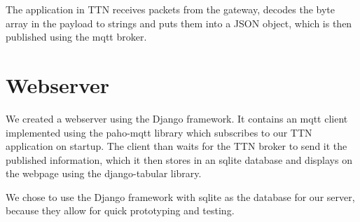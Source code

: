 	The application in TTN receives packets from the gateway, decodes the byte array in the payload to strings and puts them into a JSON object, which is then published using the mqtt broker.

\section{Webserver}
	We created a webserver using the Django framework. It contains an mqtt client implemented using the paho-mqtt library which subscribes to our TTN application on startup. The client than waits for the TTN broker to send it the published information, which it then stores in an sqlite database and displays on the webpage using the django-tabular library.

	We chose to use the Django framework with sqlite as the database for our server, because they allow for quick prototyping and testing.

